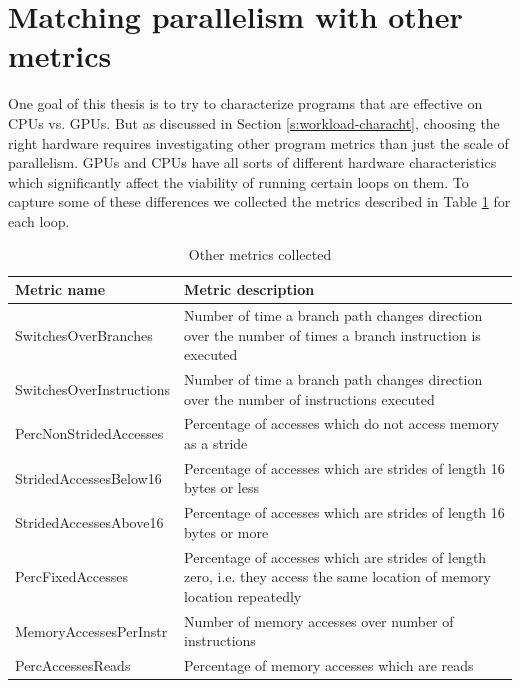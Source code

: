 \documentclass[12pt,twoside]{reedthesis}
\begin{document}
	\section{Matching parallelism with other metrics}
	
		One goal of this thesis is to try to characterize programs that are effective on CPUs vs. GPUs. But as discussed in Section \ref{s:workload-characht}, choosing the right hardware requires investigating other program metrics than just the scale of parallelism. GPUs and CPUs have all sorts of different hardware characteristics which significantly affect the viability of running certain loops on them. %
		To capture some of these differences we collected the metrics described in Table \ref{table:metric-names} for each loop.
		
		
		\begin{table}
			\caption{Other metrics collected}
			\label{table:metric-names}
			\begin{tabular}{ |p{4.5cm}|p{9.6cm}| }
				\hline
				Metric name & Metric description \\
				\hline \hline
				SwitchesOverBranches & Number of time a branch path changes direction over the number of times a branch instruction is executed \\ \hline
				SwitchesOverInstructions & Number of time a branch path changes direction over the number of instructions executed \\ \hline
				PercNonStridedAccesses & Percentage of accesses which do not access memory as a stride \\ \hline
				StridedAccessesBelow16 & Percentage of accesses which are strides of length 16 bytes or less \\ \hline
				StridedAccessesAbove16 &  Percentage of accesses which are strides of length 16 bytes or more \\ \hline
				PercFixedAccesses & Percentage of accesses which are strides of length zero, i.e. they access the same location of memory location repeatedly \\ \hline
				MemoryAccessesPerInstr & Number of memory accesses over number of instructions \\ \hline
				PercAccessesReads & Percentage of memory accesses which are reads  \\ \hline
			\end{tabular}
		\end{table}
		
\end{document}
